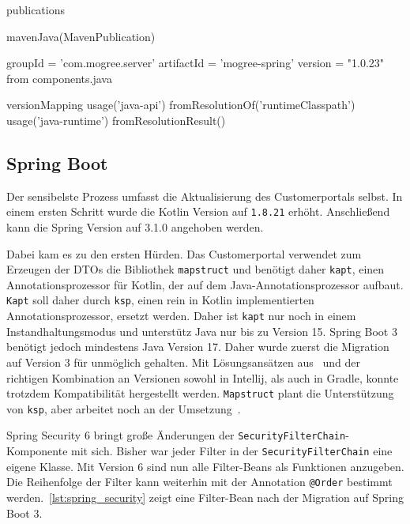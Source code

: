 \begin{JavaCode}[numbers=none, caption={caption}, label={lst:local_publish_fix}]
publications {
    mavenJava(MavenPublication) {
        groupId = 'com.mogree.server'
        artifactId = 'mogree-spring'
        version = "1.0.23"
        from components.java

        versionMapping {
            usage('java-api') {
                fromResolutionOf('runtimeClasspath')
            }
            usage('java-runtime') {
                fromResolutionResult()
            }
        }
    }
}
\end{JavaCode}

\subsection{Spring Boot}

Der sensibelste Prozess umfasst die Aktualisierung des Customerportals selbst. In einem ersten Schritt wurde die Kotlin Version auf \texttt{1.8.21} erhöht. Anschließend kann die Spring Version auf 3.1.0 angehoben werden.

Dabei kam es zu den ersten Hürden. Das Customerportal verwendet zum Erzeugen der DTOs die Bibliothek \texttt{mapstruct} und benötigt daher \texttt{kapt}, einen Annotationsprozessor für Kotlin, der auf dem Java-Annotationsprozessor aufbaut. \texttt{Kapt} soll daher durch \texttt{ksp}, einen rein in Kotlin implementierten Annotationsprozessor, ersetzt werden. Daher ist \texttt{kapt} nur noch in einem Instandhaltungsmodus und unterstütz Java nur bis zu Version 15. Spring Boot 3 benötigt jedoch mindestens Java Version 17. Daher wurde zuerst die Migration auf Version 3 für unmöglich gehalten. Mit Lösungsansätzen aus~\parencite{kaptjdk17} und der richtigen Kombination an Versionen sowohl in Intellij, als auch in Gradle, konnte trotzdem Kompatibilität hergestellt werden. \texttt{Mapstruct} plant die Unterstützung von \texttt{ksp}, aber arbeitet noch an der Umsetzung~\parencite{mapstructksp}.

Spring Security 6 bringt große Änderungen der \texttt{SecurityFilterChain}-Komponente mit sich. Bisher war jeder Filter in der \texttt{SecurityFilterChain} eine eigene Klasse. Mit Version 6 sind nun alle Filter-Beans als Funktionen anzugeben. Die Reihenfolge der Filter kann weiterhin mit der Annotation \texttt{@Order} bestimmt werden.~\autoref{lst:spring_security} zeigt eine Filter-Bean nach der Migration auf Spring Boot 3.

